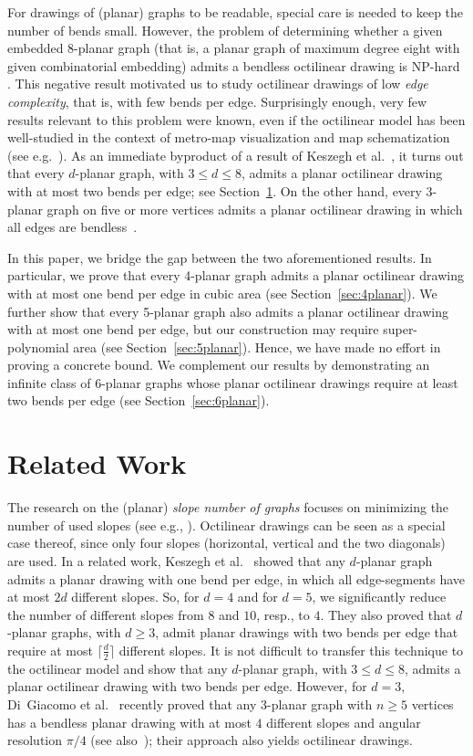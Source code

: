 \documentclass[a4paper,twoside,11pt]{article}
\begin{document}
For drawings of (planar) graphs to be readable, special care is
needed to keep the number of bends small. However, the problem of
determining whether a given embedded 8-planar graph (that is, a
planar graph of maximum degree eight with given combinatorial
embedding) admits a bendless octilinear drawing is NP-hard
\cite{Noellenburg05}. This negative result motivated us to study
octilinear drawings of low \emph{edge complexity}, that is, with few
bends per edge. Surprisingly enough, very few results relevant to
this problem were known, even if the octilinear model has been
well-studied in the context of metro-map visualization and map
schematization (see e.g.~\cite{Wolff13}). As an immediate byproduct
of a result of Keszegh et al.~\cite{KPP13}, it turns out that every
$d$-planar graph, with $3 \leq d \leq 8$, admits a planar octilinear
drawing with at most two bends per edge; see
Section~\ref{sec:relatedwork}. On the other hand, every 3-planar
graph on five or more vertices admits a planar octilinear drawing in
which all edges are bendless~\cite{GLM14,Kant92}.

In this paper, we bridge the gap between the two aforementioned
results. In particular, we prove that every 4-planar graph admits a
planar octilinear drawing with at most one bend per edge in cubic
area (see Section~\ref{sec:4planar}). We further show that every
5-planar graph also admits a planar octilinear drawing with at most
one bend per edge, but our construction may require super-polynomial
area (see Section~\ref{sec:5planar}). Hence, we have made no effort
in proving a concrete bound. We complement our results by
demonstrating an infinite class of 6-planar graphs whose planar
octilinear drawings require at least two bends per edge (see
Section~\ref{sec:6planar}).

\section{Related Work}
\label{sec:relatedwork}


The research on the (planar) \emph{slope number of graphs} focuses
on minimizing the number of used slopes (see e.g.,
\cite{JJ13,KPP13,KPPT08,LLMN13,MP11}). Octilinear drawings can be
seen as a special case thereof, since only four slopes (horizontal,
vertical and the two diagonals) are used. In a related work, Keszegh
et al.~\cite{KPP13} showed that any $d$-planar graph admits a planar
drawing with one bend per edge, in which all edge-segments have at
most $2d$ different slopes. So, for $d=4$ and for $d=5$, we
significantly reduce the number of different slopes from $8$ and
$10$, resp., to $4$. They also proved that $d$-planar graphs, with
$d \geq 3$, admit planar drawings with two bends per edge that
require at most $\lceil\frac{d}{2}\rceil$ different slopes. It is
not difficult to transfer this technique to the octilinear model and
show that any $d$-planar graph, with $3 \leq d \leq 8$, admits a
planar octilinear drawing with two bends per edge. However, for
$d=3$, Di~Giacomo et al.~\cite{GLM14} recently proved that any
3-planar graph with $n \geq 5$ vertices has a bendless planar
drawing with at most $4$ different slopes and angular resolution
$\pi/4$ (see also~\cite{Kant92}); their approach also yields
octilinear drawings.
\end{document}

